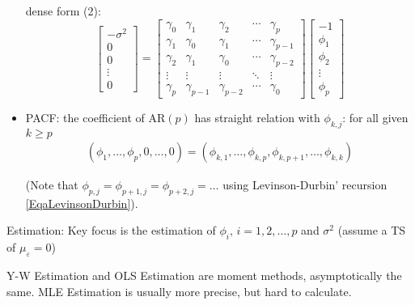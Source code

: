 \begin{itemize}[topsep=2pt,itemsep=0pt]
        dense form (2):
        \begin{equation}
            \begin{bmatrix}
                -\sigma ^2\\ 0\\ 0 \\ \vdots \\0
            \end{bmatrix} =
            \begin{bmatrix}
                \gamma _0&\gamma _1&\gamma _2&\cdots &\gamma _p\\
                \gamma _1&\gamma _0&\gamma _1&\cdots&\gamma _{p-1}\\
                \gamma _2&\gamma _1&\gamma _0&\cdots&\gamma _{p-2}\\
                \vdots&\vdots&\vdots&\ddots&\vdots\\
                \gamma _p&\gamma _{p-1}&\gamma _{p-2}&\cdots&\gamma _0
            \end{bmatrix}
            \begin{bmatrix}
                -1\\\phi _1\\\phi _2\\ \vdots \\\phi _p
            \end{bmatrix}
        \end{equation}

        \item PACF: the coefficient of AR$ (p) $ has straight relation with $ \phi _{k,j} $: for all given $ k\geq p $
        \begin{align*}
            (\phi _1,\ldots,\phi _p,0,\ldots,0)=(\phi _{k,1},\ldots,\phi _{k,p},\phi _{k,p+1},\ldots,\phi _{k,k})
        \end{align*}

        (Note that $ \phi _{p,j}=\phi _{p+1,j}=\phi _{p+2,j}=\ldots $ using Levinson-Durbin' recursion \autoref{EqaLevinsonDurbin}).       
        
       
    \end{itemize}
    
\begin{point}
    Estimation: Key focus is the estimation of $ \phi _i,\,i=1,2,\ldots,p $ and $ \sigma ^2 $ (assume a TS of $ \mu _\varepsilon =0 $)
\end{point}

    Y-W Estimation and OLS Estimation are moment methods, asymptotically the same. MLE Estimation is usually more precise, but hard to calculate.

